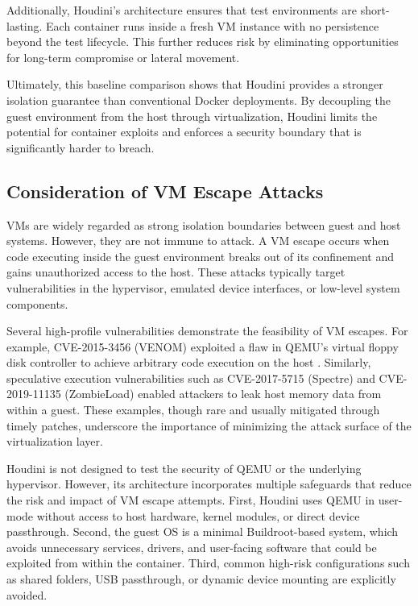 \documentclass[12pt]{report}
\begin{document}
\begin{doublespace}
Additionally, Houdini’s architecture ensures that test environments are short-lasting. Each container runs inside a fresh VM instance with no persistence beyond the test lifecycle. This further reduces risk by eliminating opportunities for long-term compromise or lateral movement.

Ultimately, this baseline comparison shows that Houdini provides a stronger isolation guarantee than conventional Docker deployments. By decoupling the guest environment from the host through virtualization, Houdini limits the potential for container exploits and enforces a security boundary that is significantly harder to breach.

\subsection{Consideration of VM Escape Attacks}

VMs are widely regarded as strong isolation boundaries between guest and host systems. However, they are not immune to attack. A VM escape occurs when code executing inside the guest environment breaks out of its confinement and gains unauthorized access to the host. These attacks typically target vulnerabilities in the hypervisor, emulated device interfaces, or low-level system components.

Several high-profile vulnerabilities demonstrate the feasibility of VM escapes. For example, CVE-2015-3456 (VENOM) exploited a flaw in QEMU's virtual floppy disk controller to achieve arbitrary code execution on the host \cite{venom}. Similarly, speculative execution vulnerabilities such as CVE-2017-5715 (Spectre) \cite{spectre} and CVE-2019-11135 (ZombieLoad) \cite{zombieload} enabled attackers to leak host memory data from within a guest. These examples, though rare and usually mitigated through timely patches, underscore the importance of minimizing the attack surface of the virtualization layer.

Houdini is not designed to test the security of QEMU or the underlying hypervisor. However, its architecture incorporates multiple safeguards that reduce the risk and impact of VM escape attempts. First, Houdini uses QEMU in user-mode without access to host hardware, kernel modules, or direct device passthrough. Second, the guest OS is a minimal Buildroot-based system, which avoids unnecessary services, drivers, and user-facing software that could be exploited from within the container. Third, common high-risk configurations such as shared folders, USB passthrough, or dynamic device mounting are explicitly avoided.


\end{doublespace}
\end{document}
